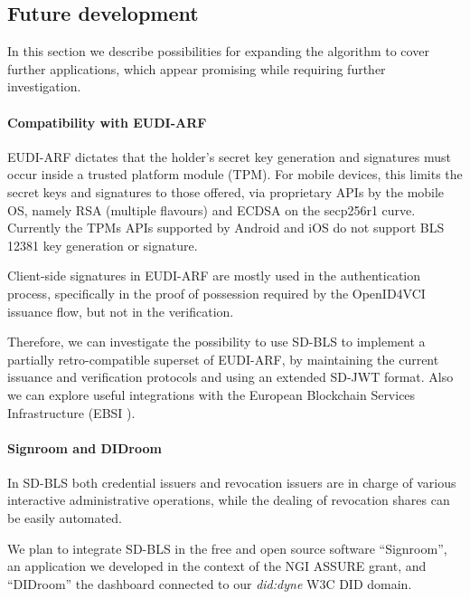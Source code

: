 \subsection{Future development}

In this section we describe possibilities for expanding the algorithm
to cover further applications, which appear promising while requiring
further investigation.

\paragraph{Compatibility with EUDI-ARF}

EUDI-ARF dictates that the holder's secret key generation and
signatures must occur inside a trusted platform module (TPM). For
mobile devices, this limits the secret keys and signatures to those
offered, via proprietary APIs by the mobile OS, namely RSA (multiple
flavours) and ECDSA on the secp256r1 curve. Currently the TPMs APIs
supported by Android and iOS do not support BLS 12381 key generation
or signature.

Client-side signatures in EUDI-ARF are mostly used in the
authentication process, specifically in the proof of possession
required by the OpenID4VCI\cite{OID4VCI} issuance flow, but not in the
verification.

Therefore, we can investigate the possibility to use SD-BLS to
implement a partially retro-compatible superset of EUDI-ARF, by
maintaining the current issuance and verification protocols and using
an extended SD-JWT format. Also we can explore useful integrations
with the European Blockchain Services Infrastructure (EBSI
\cite{ebsi}).

\paragraph{Signroom and DIDroom}

In SD-BLS both credential issuers and revocation issuers are in charge
of various interactive administrative operations, while the dealing of
revocation shares can be easily automated.

We plan to integrate SD-BLS in the free and open source software
``Signroom'', an application we developed in the context of the NGI
ASSURE grant, and ``DIDroom'' the dashboard connected to our
\emph{did:dyne} W3C DID domain.

